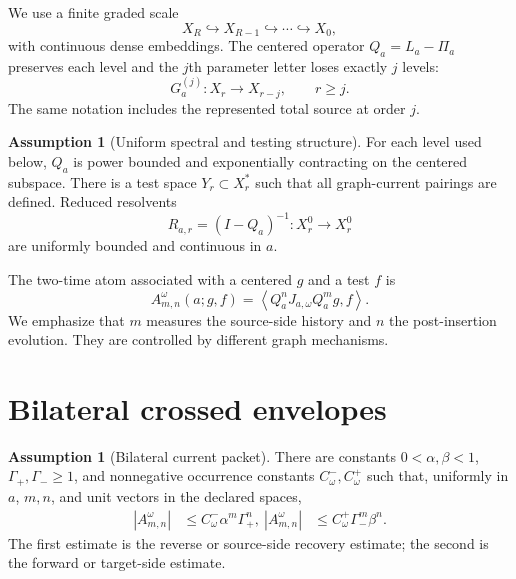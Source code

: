 \documentclass[11pt,reqno]{amsart}
\theoremstyle{definition}
\newtheorem{assumption}[theorem]{Assumption}
\theoremstyle{remark}
\newcommand{\abs}[1]{\left\lvert #1\right\rvert}
\newcommand{\pair}[2]{\left\langle #1,#2\right\rangle}
\begin{document}
We use a finite graded scale
\begin{equation}\label{eq:ladder}
 X_R\hookrightarrow X_{R-1}\hookrightarrow\cdots\hookrightarrow X_0,
\end{equation}
with continuous dense embeddings.  The centered operator $Q_a=L_a-\Pi_a$
preserves each level and the $j$th parameter letter loses exactly $j$ levels:
\begin{equation}\label{eq:graded-letter}
 G_a^{(j)}:X_r\longrightarrow X_{r-j},
 \qquad r\ge j.
\end{equation}
The same notation includes the represented total source at order $j$.

\begin{assumption}[Uniform spectral and testing structure]\label{ass:spectral}
For each level used below, $Q_a$ is power bounded and exponentially contracting
on the centered subspace.  There is a test space $Y_r\subset X_r^*$ such that
all graph-current pairings are defined.  Reduced resolvents
\[
 R_{a,r}=(I-Q_a)^{-1}:X_r^0\to X_r^0
\]
are uniformly bounded and continuous in $a$.
\end{assumption}

The two-time atom associated with a centered $g$ and a test $f$ is
\begin{equation}\label{eq:atom}
 A_{m,n}^{\omega}(a;g,f)
 =\pair{Q_a^nJ_{a,\omega}Q_a^m g}{f}.
\end{equation}
We emphasize that $m$ measures the source-side history and $n$ the
post-insertion evolution.  They are controlled by different graph mechanisms.

\section{Bilateral crossed envelopes}\label{sec:bilateral}

\begin{assumption}[Bilateral current packet]\label{ass:bilateral}
There are constants $0<\alpha,\beta<1$, $\Gamma_+,\Gamma_-\ge1$, and
nonnegative occurrence constants $C_\omega^-,C_\omega^+$ such that, uniformly
in $a$, $m,n$, and unit vectors in the declared spaces,
\begin{align}
 \abs{A_{m,n}^{\omega}}
 &\le C_\omega^-\alpha^m\Gamma_+^n,
 \label{eq:reverse}\
 \abs{A_{m,n}^{\omega}}
 &\le C_\omega^+\Gamma_-^m\beta^n.
 \label{eq:forward}
\end{align}
The first estimate is the reverse or source-side recovery estimate; the second
is the forward or target-side estimate.
\end{assumption}
\end{document}
